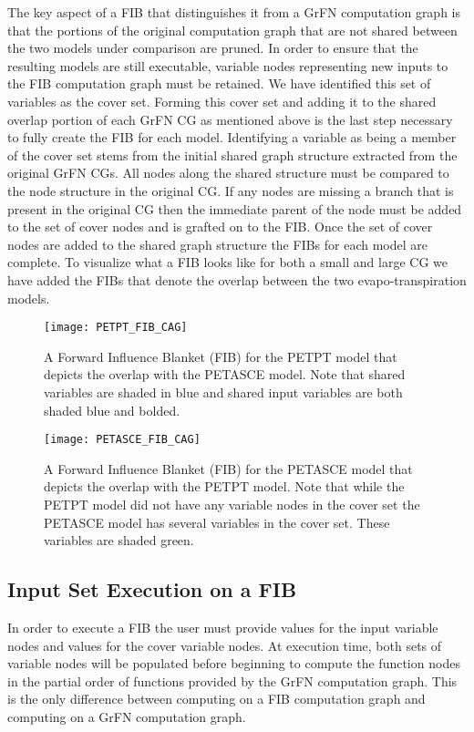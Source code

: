 The key aspect of a FIB that distinguishes it from a GrFN computation graph is that the portions of the original computation graph that are not shared between the two models under comparison are pruned.
In order to ensure that the resulting models are still executable, variable nodes representing new inputs to the FIB computation graph must be retained.
We have identified this set of variables as the cover set.
Forming this cover set and adding it to the shared overlap portion of each GrFN CG as mentioned above is the last step necessary to fully create the FIB for each model.
Identifying a variable as being a member of the cover set stems from the initial shared graph structure extracted from the original GrFN CGs.
All nodes along the shared structure must be compared to the node structure in the original CG.
If any nodes are missing a branch that is present in the original CG then the immediate parent of the node must be added to the set of cover nodes and is grafted on to the FIB.
Once the set of cover nodes are added to the shared graph structure the FIBs for each model are complete.
To visualize what a FIB looks like for both a small and large CG we have added the FIBs that denote the overlap between the two evapo-transpiration models.

\FloatBarrier
\begin{figure}[!htbp]
    \label{petpt_fib}
    \centering
    \texttt{[image: PETPT\_FIB\_CAG]}%
    \caption[PETPT FIB CAG]{A Forward Influence Blanket (FIB) for the PETPT model that depicts the overlap with the PETASCE model. Note that shared variables are shaded in blue and shared input variables are both shaded blue and bolded.}
\end{figure}

\begin{figure}[!htbp]
    \label{petasce_fib}
    \centering
    \texttt{[image: PETASCE\_FIB\_CAG]}%
    \caption[PETASCE FIB CAG]{A Forward Influence Blanket (FIB) for the PETASCE model that depicts the overlap with the PETPT model. Note that while the PETPT model did not have any variable nodes in the cover set the PETASCE model has several variables in the cover set. These variables are shaded green.}
\end{figure}
\FloatBarrier

\subsection{Input Set Execution on a FIB\label{sec:fib_exec}}
In order to execute a FIB the user must provide values for the input variable nodes and values for the cover variable nodes. At execution time, both sets of variable nodes will be populated before beginning to compute the function nodes in the partial order of functions provided by the GrFN computation graph. This is the only difference between computing on a FIB computation graph and computing on a GrFN computation graph.

